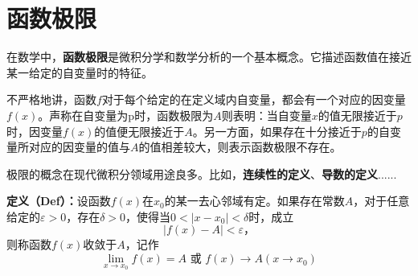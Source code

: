 \documentclass[UTF8]{ctexart}
\begin{document}

\section{函数极限}

在数学中，\textbf{函数极限}是微积分学和数学分析的一个基本概念。它描述函数值在接近某一给定的自变量时的特征。

不严格地讲，函数$f$对于每个给定的在定义域内自变量，都会有一个对应的因变量$f(x)$。声称在自变量为p时，函数极限为$A$则表明：当自变量$x$的值无限接近于$p$时，因变量$f(x)$的值便无限接近于$A$。另一方面，如果存在十分接近于$p$的自变量所对应的因变量的值与$A$的值相差较大，则表示函数极限不存在。

极限的概念在现代微积分领域用途良多。比如，\textbf{连续性的定义}、\textbf{导数的定义}......
\begin{question}
\textbf{定义（Def）：}设函数$f(x)$在$x_0$的某一去心邻域有定。如果存在常数$A$，对于任意给定的$\varepsilon > 0$，存在$\delta > 0$，使得当$0 < |x-x_0| < \delta$时，成立
\begin{equation}
  |f(x)-A| < \varepsilon \text{，}
\end{equation}
则称函数$f(x)$收敛于$A$，记作
\begin{equation}
  \lim_{x \to x_0} f(x) = A \text{ 或 \ }f(x) \to A(x \to x_0)
\end{equation}
\end{question}
\end{document}
